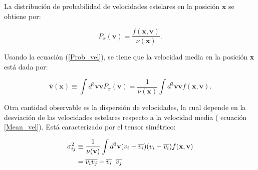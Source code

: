 La distribución de probabilidad de velocidades estelares en la posición $\textbf{x}$ se obtiene por:

\begin{equation}
\label{Prob_vel}
P_x(\textbf{v}) = \frac{f(\textbf{x}, \textbf{v})}{\nu(\textbf{x})}.
\end{equation}







Usando la ecuación (\ref{Prob_vel}), se tiene que la velocidad media en la posición \textbf{x} está dada por:

\begin{equation}
\label{Mean_vel}
\overline{\textbf{v}} (\textbf{x}) \equiv \int d^3\textbf{v} \textbf{v} P_x(\textbf{v}) = \frac{1}{\nu(\textbf{x}) } \int d^3\textbf{v} \textbf{v} f(\textbf{x}, \textbf{v}).
\end{equation}

Otra cantidad observable es la dispersión de velocidades, la cual depende en la desviación de las velocidades estelares respecto a la velocidad media ( ecuación \ref{Mean_vel}). Está caracterizado por el tensor simétrico:

\begin{align}
\sigma_{ij}^2 & \equiv \frac{1}{ \nu( \textbf{v} ) }  \int d^3\textbf{v} ( v_i - \overline{v_i} ) ( v_i - \overline{v_i} )  f(\textbf{x}, \textbf{v}) \\
\label{Tens_disp_vel}
& = \overline{v_i v_j} - \overline{v_i} \hspace{2mm} \overline{v_j}
\end{align}

